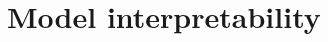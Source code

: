 \documentclass[../main.tex]{subfiles}
\begin{document}
			



\section{Model interpretability}



\end{document}
